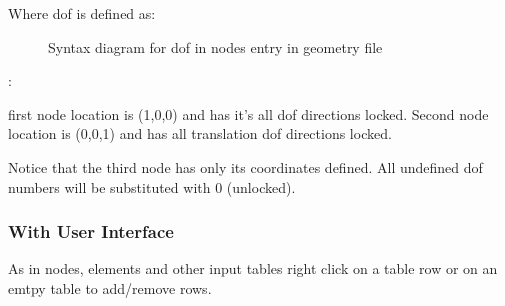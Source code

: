 \documentclass[letterpaper,10pt,english]{sphinxmanual}
\begin{document}
Where dof is defined as:

\begin{figure}[htbp]
\centering
\capstart

\noindent{}
\caption{Syntax diagram for dof in nodes entry in geometry file}\label{\detokenize{making_a_model:id22}}\end{figure}

:

\begin{sphinxVerbatim}[commandchars=\\\{\}]
\end{sphinxVerbatim}

first node location is (\sphinxhyphen{}1,0,0) and has it’s all dof directions locked. Second node location is (0,0,\sphinxhyphen{}1) and has all
translation dof directions locked.

Notice that the third node has only its coordinates defined. All undefined dof numbers will be substituted
with 0 (unlocked).


\subsubsection{With User Interface}
\label{\detokenize{making_a_model:with-user-interface}}
As in nodes, elements and other input tables
right click on a table row or on an emtpy table to add/remove rows.
\end{document}
